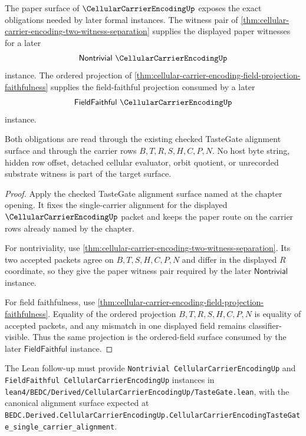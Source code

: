 \begin{theorem}
\label{thm:cellular-carrier-encoding-formal-target-boundary}
The paper surface of $\CellularCarrierEncodingUp$ exposes the exact obligations needed by later formal instances. The witness pair of \autoref{thm:cellular-carrier-encoding-two-witness-separation} supplies the displayed paper witnesses for a later
$$
\mathsf{Nontrivial}\ \CellularCarrierEncodingUp
$$
instance. The ordered projection of \autoref{thm:cellular-carrier-encoding-field-projection-faithfulness} supplies the field-faithful projection consumed by a later
$$
\mathsf{FieldFaithful}\ \CellularCarrierEncodingUp
$$
instance.

Both obligations are read through the existing checked TasteGate alignment surface and through the carrier rows $B,T,R,S,H,C,P,N$. No host byte string, hidden row offset, detached cellular evaluator, orbit quotient, or unrecorded substrate witness is part of the target surface.
\end{theorem}
\begin{proof}
Apply the checked TasteGate alignment surface named at the chapter opening. It fixes the single-carrier alignment for the displayed $\CellularCarrierEncodingUp$ packet and keeps the paper route on the carrier rows already named by the chapter.

For nontriviality, use \autoref{thm:cellular-carrier-encoding-two-witness-separation}. Its two accepted packets agree on $B,T,S,H,C,P,N$ and differ in the displayed $R$ coordinate, so they give the paper witness pair required by the later $\mathsf{Nontrivial}$ instance.

For field faithfulness, use \autoref{thm:cellular-carrier-encoding-field-projection-faithfulness}. Equality of the ordered projection $B,T,R,S,H,C,P,N$ is equality of accepted packets, and any mismatch in one displayed field remains classifier-visible. Thus the same projection is the ordered-field surface consumed by the later $\mathsf{FieldFaithful}$ instance.
\end{proof}

The Lean follow-up must provide \texttt{Nontrivial CellularCarrierEncodingUp} and \texttt{FieldFaithful CellularCarrierEncodingUp} instances in \texttt{lean4/BEDC/Derived/CellularCarrierEncodingUp/TasteGate.lean}, with the canonical alignment surface expected at \texttt{BEDC.Derived.CellularCarrierEncodingUp.CellularCarrierEncodingTasteGate\_single\_carrier\_alignment}.

